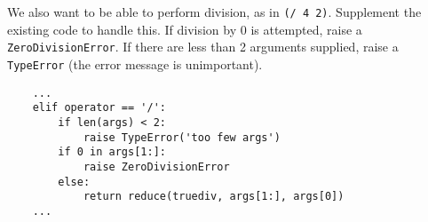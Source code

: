 \question We also want to be able to perform division, as in {\tt (/ 4 2)}.
Supplement the existing code to handle this. If division by 0 is attempted,
raise a {\tt ZeroDivisionError}. If there are less than 2 arguments supplied,
raise a {\tt TypeError} (the error message is unimportant).
\begin{solution}[1.7in]
\begin{lstlisting}
    ...
    elif operator == '/':
        if len(args) < 2:
            raise TypeError('too few args')
        if 0 in args[1:]:
            raise ZeroDivisionError
        else:
            return reduce(truediv, args[1:], args[0])
    ...
\end{lstlisting}
\end{solution}

